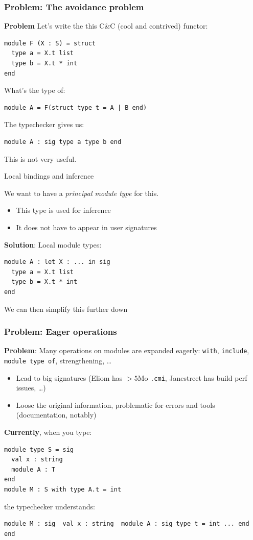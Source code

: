 \documentclass[aspectratio=169,dvipsnames,svgnames,10pt]{beamer}
\begin{document}
\begin{frame}
  \frametitle{Problem: The avoidance problem}

  \textbf{Problem} Let's write the this C\&C (cool and contrived) functor:
\begin{verbatim}
module F (X : S) = struct
  type a = X.t list
  type b = X.t * int
end
\end{verbatim}

  What's the type of:
\begin{verbatim}
module A = F(struct type t = A | B end)
\end{verbatim}
  \pause
  The typechecker gives us:
\begin{verbatim}
module A : sig type a type b end
\end{verbatim}
  This is not very useful. 
\end{frame}

\begin{frame}[fragile]{Local bindings and inference}

  We want to have a \emph{principal module type} for this.
  \begin{itemize}
  \item This type is used for inference
  \item It does not have to appear in user signatures
  \end{itemize}
  \pause
  
  {\bf Solution}: Local module types:
\begin{verbatim}
module A : let X : ... in sig
  type a = X.t list
  type b = X.t * int
end
\end{verbatim}

  We can then simplify this further down
\end{frame}

\begin{frame}[fragile]
  \frametitle{Problem: Eager operations}

  \textbf{Problem}: Many operations on modules are expanded eagerly: \texttt{with}, \texttt{include}, \texttt{module type of}, strengthening, \dots
  \begin{itemize}
  \item Lead to big signatures (Eliom has $>5$Mo {\tt .cmi}, Janestreet has build perf issues, \dots)
  \item Loose the original information, problematic for errors and tools (documentation, notably)
  \end{itemize}

  \pause
  \textbf{Currently}, when you type:
\begin{verbatim}
module type S = sig 
  val x : string
  module A : T
end
module M : S with type A.t = int
\end{verbatim}

  the typechecker understands:
\begin{verbatim}
module M : sig  val x : string  module A : sig type t = int ... end  end
\end{verbatim}
\end{frame}
\end{document}
